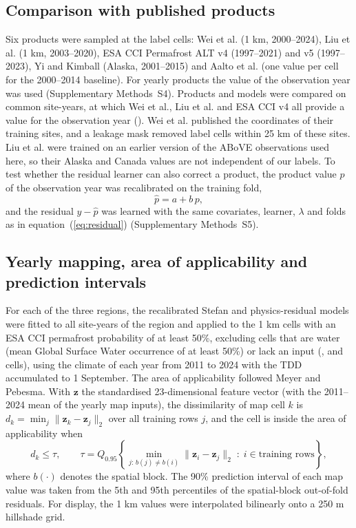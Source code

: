 \subsection{Comparison with published products}
Six products were sampled at the label cells: Wei et al.\cite{Wei2026} (1 km, 2000--2024), Liu et al.\cite{Liu2024} (1 km, 2003--2020), ESA CCI Permafrost ALT v4 (1997--2021) and v5 (1997--2023)\cite{Westermann2024,Westermann2025}, Yi and Kimball\cite{YiKimball2019} (Alaska, 2001--2015) and Aalto et al.\cite{Aalto2018} (one value per cell for the 2000--2014 baseline). For yearly products the value of the observation year was used (Supplementary Methods~S4). Products and models were compared on common site-years, at which Wei et al., Liu et al. and ESA CCI v4 all provide a value for the observation year (\nyrscc). Wei et al. published the coordinates of their training sites, and a leakage mask removed label cells within 25 km of these sites. Liu et al. were trained on an earlier version of the ABoVE observations used here\cite{Liu2024}, so their Alaska and Canada values are not independent of our labels. To test whether the residual learner can also correct a product, the product value $p$ of the observation year was recalibrated on the training fold,
\begin{equation}
\hat{p} = a + b\, p,
\label{eq:prod}
\end{equation}
and the residual $y-\hat{p}$ was learned with the same covariates, learner, $\lambda$ and folds as in equation~(\ref{eq:residual}) (Supplementary Methods~S5).

\subsection{Yearly mapping, area of applicability and prediction intervals}
For each of the three regions, the recalibrated Stefan and physics-residual models were fitted to all site-years of the region and applied to the 1 km cells with an ESA CCI permafrost probability of at least 50\%, excluding cells that are water (mean Global Surface Water occurrence of at least 50\%) or lack an input (\nncellmapAk{}, \nncellmapLe{} and \nncellmapCa{} cells), using the climate of each year from 2011 to 2024 with the TDD accumulated to 1 September. The area of applicability followed Meyer and Pebesma\cite{MeyerPebesma2021}. With $\mathbf{z}$ the standardised 23-dimensional feature vector (with the 2011--2024 mean of the yearly map inputs), the dissimilarity of map cell $k$ is $d_k = \min_{j} \lVert \mathbf{z}_k - \mathbf{z}_j \rVert_2$ over all training rows $j$, and the cell is inside the area of applicability when
\begin{equation}
d_k \leq \tau, \qquad \tau = Q_{0.95}\!\left\{ \min_{j:\, b(j) \neq b(i)} \lVert \mathbf{z}_i - \mathbf{z}_j \rVert_2 \;:\; i \in \text{training rows} \right\},
\label{eq:aoa}
\end{equation}
where $b(\cdot)$ denotes the spatial block. The 90\% prediction interval of each map value was taken from the 5th and 95th percentiles of the spatial-block out-of-fold residuals. For display, the 1 km values were interpolated bilinearly onto a 250 m hillshade grid.

